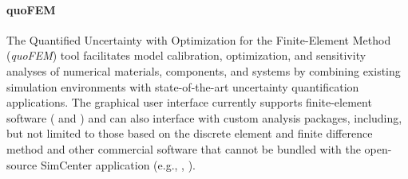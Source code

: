 \paragraph{quoFEM} The Quantified Uncertainty with Optimization for the Finite-Element Method (\emph{quoFEM}) tool facilitates model calibration, optimization, and sensitivity analyses of numerical materials, components, and systems by combining existing simulation environments with state-of-the-art uncertainty quantification applications. The graphical user interface currently supports finite-element software ( and ) and can also interface with custom analysis packages, including, but not limited to those based on the discrete element and finite difference method and other commercial software that cannot be bundled with the open-source SimCenter application (e.g., , ).  




